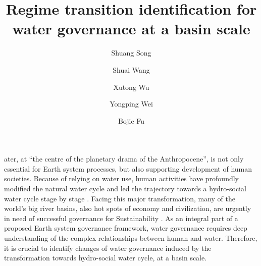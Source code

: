 \documentclass[9pt, twocolumn, twoside, lineno]{pnas-new}
\title{Regime transition identification for water governance at a basin scale}
\author[a, b]{Shuang Song}  %
\author[a, b]{Shuai Wang}  %
\author[c, d]{Xutong Wu}  %
\author[e]{Yongping Wei} %
\author[a, b, 1]{Bojie Fu}  %
\affil[a]{ %
	State Key Laboratory of Earth Surface Processes and Resource Ecology, 
	Faculty of Geographical Science, 
	Beijing Normal University, 
	Beijing 100875, 
	P.R. China
}
\affil[b]{ %
	Institute of Land Surface System and Sustainability, 
	Faculty of Geographical Science, 
	Beijing Normal University, 
	Beijing 100875, 
	P.R. China
}
\affil[c]{ %
	College of Urban and Environmental Sciences, 
	Peking University, 
	Beijing 100871, 
	P.R. China
}
\affil[d]{ %
	State Key Laboratory of Urban and Regional Ecology, 
	Research Center for Eco-Environmental Sciences, 
	Chinese Academy of Sciences, 
	Beijing 100085, 
	P.R. China 
}
\affil[e]{ %
	School of Earth and Environmental Sciences, 
	The University of Queensland, 
	Brisbane 4067, 
	Australia
}
\begin{document}
\maketitle
\thispagestyle{firststyle}

\label{introduction-section-1}
ater, at “the centre of the planetary drama of the Anthropocene”, is not only essential for Earth system processes, but also supporting development of human societies. 
Because of relying on water use, human activities have profoundly modified the natural water cycle and led the trajectory towards a hydro-social water cycle stage by stage
\cite{gleesonIlluminatingWaterCycle2020,cummingLinkingEconomicGrowth2018}.
Facing this major transformation, many of the world's big river basins, also hot spots of economy and civilization, are urgently in need of successful governance for Sustainability
\cite{bestAnthropogenicStressesWorld2019}. 
As an integral part of a proposed Earth system governance framework, water governance requires deep understanding of the complex relationships between human and water.
Therefore, it is crucial to identify changes of water governance induced by the transformation towards hydro-social water cycle, at a basin scale.
\end{document}
